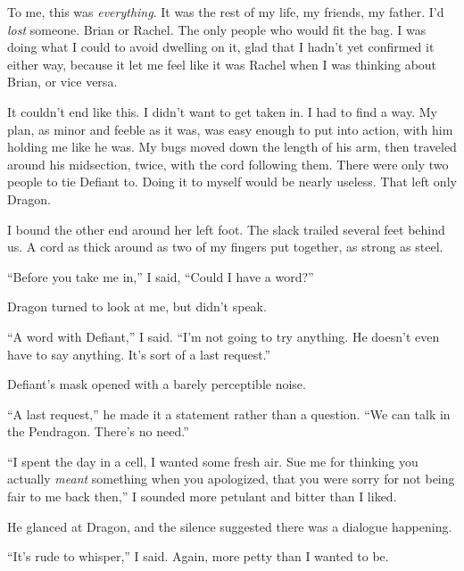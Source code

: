 To me, this was \emph{everything}.  It was the rest of my life, my friends, my father.  I'd \emph{lost} someone.  Brian or Rachel.  The only people who would fit the bag.  I was doing what I could to avoid dwelling on it, glad that I hadn't yet confirmed it either way, because it let me feel like it was Rachel when I was thinking about Brian, or vice versa.



It couldn't end like this.  I didn't want to get taken in.  I had to find a way.  My plan, as minor and feeble as it was, was easy enough to put into action, with him holding me like he was.  My bugs moved down the length of his arm, then traveled around his midsection, twice, with the cord following them.  There were only two people to tie Defiant to.  Doing it to myself would be nearly useless.  That left only Dragon.



I bound the other end around her left foot.  The slack trailed several feet behind us.  A cord as thick around as two of my fingers put together, as strong as steel.



``Before you take me in,'' I said, ``Could I have a word?''



Dragon turned to look at me, but didn't speak.



``A word with Defiant,'' I said.  ``I'm not going to try anything.  He doesn't even have to say anything.  It's sort of a last request.''



Defiant's mask opened with a barely perceptible noise.



``A last request,'' he made it a statement rather than a question.  ``We can talk in the Pendragon.  There's no need.''



``I spent the day in a cell, I wanted some fresh air.  Sue me for thinking you actually \emph{meant} something when you apologized, that you were sorry for not being fair to me back then,''  I sounded more petulant and bitter than I liked.



He glanced at Dragon, and the silence suggested there was a dialogue happening.



``It's rude to whisper,'' I said.  Again, more petty than I wanted to be.



